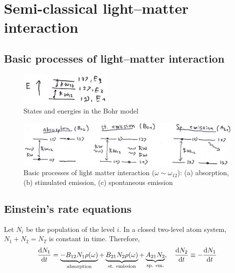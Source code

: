 \section{Semi-classical light--matter interaction}
\subsection{Basic processes of light--matter interaction}
\begin{figure}[H]
	\centering
	\includegraphics[width=0.4\textwidth]{./images/3-bohr-energies}
	\caption{States and energies in the Bohr model}
	\label{fig:bohr-energies}
\end{figure}

\begin{figure}[H]
	\centering
	\includegraphics[width=\textwidth]{./images/3-basic-processes}
	\caption{Basic processes of light matter interaction ($\omega \sim \omega_{12}$): (a) absorption, (b) stimulated emission, (c) spontaneous emission}
	\label{fig:basic-processes}
\end{figure}

\subsection{Einstein's rate equations}
Let $N_{i}$ be the population of the level $i$. In a closed two-level atom system, $N_{1} + N_{2} = N_{T}$ is constant in time. Therefore,
\begin{align}
	\dv{N_{1}}{t} = \underbrace{- B_{12} N_{1} \rho(\omega)}_{\text{absorption}} + \underbrace{B_{21} N_{2} \rho(\omega)}_{\text{st. emission}} + \underbrace{A_{21} N_{2}}_{\text{sp. em.}} \qc \dv{N_{2}}{t} \equiv - \dv{N_{1}}{t}
\end{align}

